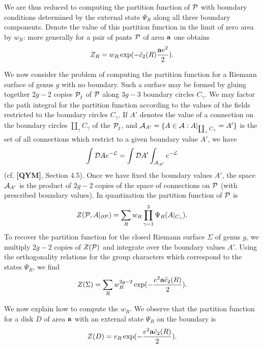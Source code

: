 \documentclass[12pt]{article}
\begin{document}
We are thus reduced to computing the partition function of $\cal P$ with
boundary conditions determined by the external 
state $\Psi_R$ along all three boundary components. Denote the value
of this partition function in the limit of zero area 
by $w_R$: more generally for a pair of pants $\cal P$ of area ${\bf a} $
one
obtains
\begin{equation} \label{partpants}
Z_R = w_R \exp ( - \tilde{c}_2 (R) \frac{{\bf a} e^2}{2} ). 
\end{equation}
  
     We now consider the problem of computing the partition function
for a Riemann surface of genus $g$ with no boundary. Such a surface may
be formed by gluing together $2g-2$ copies ${\cal P}_j$ 
of $\cal P$ along
$3g-3$ boundary circles $C_\gamma$. We may factor the path integral for
the partition function according to the values of the fields restricted
to the boundary circles $C_\gamma$. If 
$A'  $ denotes the value of a connection 
on the boundary circles $\coprod_\gamma C_\gamma $ of the 
${\cal P}_j$, and 
${\cal A}_{A'} = \{ A \in {\cal A}: 
A|_{\coprod_\gamma C_\gamma}  = A' \}$  is the set of 
all connections which restrict to a  given boundary
value $A'$, we have
\begin{equation}
\int { \cal D} A e^{- { \cal L}} = 
\int { \cal D} A' \int_{{\cal A}_{A'}} e^{- { \cal L}}
\end{equation}
(cf. {\bf [QYM]}, Section 4.5).
Once we have fixed the boundary values $A'$, the space
${\cal A}_{A'}$ is the product of 
$2g-2$ copies of the space of connections on ${\cal P}$ (with prescribed
boundary values). In quantization the partition function of 
${\cal P}$ is 
\begin{equation} 
Z({\cal P}, A|_{\partial {\cal P}}) = \sum_R w_R \prod_{\gamma = 1}^3 
\Psi_R (A|_{C_\gamma} ). 
\end{equation}
To recover the partition function for the closed 
Riemann surface $\Sigma$ of genus $g$, we multiply 
$2g-2$ copies of $Z({\cal P})$ and integrate over the
boundary values $A'$.
Using the orthogonality relations for the group characters
which correspond to the states
$\Psi_R$, we find
\begin{equation}
Z (\Sigma) = 
\sum_R w_R^{2g-2} \exp (  - \frac{e^2 {\bf a} \tilde{c}_2 (R)} {2}  ). 
\end{equation}

We now explain how to compute the $w_R$. We observe that the 
partition function for a disk $D$ of area ${\bf a}$ with an external
state $\Psi_R $ on the boundary is 
\begin{equation} 
Z(D) = v_R  \exp (  - \frac{e^2 {\bf a} \tilde{c}_2(R)} {2}  ).
\end{equation}
\end{document}
